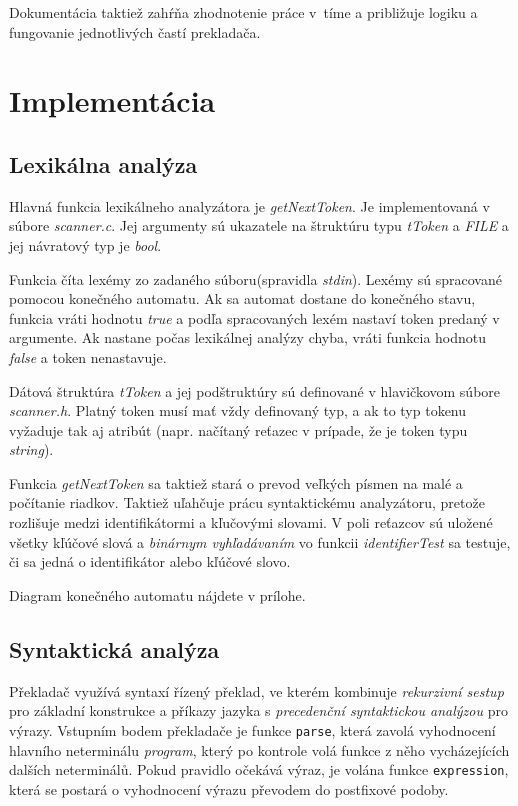 \documentclass{article}
\begin{document}
        Dokumentácia taktiež zahŕňa zhodnotenie práce v~tíme a približuje logiku a fungovanie
        jednotlivých častí prekladača. 
    
    \section{Implementácia}
    
        \subsection{Lexikálna analýza}
        Hlavná funkcia lexikálneho analyzátora je \emph{getNextToken}. Je implementovaná v súbore \emph{scanner.c}.
        Jej argumenty sú ukazatele na štruktúru typu \emph{tToken} a \emph{FILE} a jej návratový typ je \emph{bool}. 

        Funkcia číta lexémy zo zadaného súboru(spravidla \emph{stdin}). Lexémy sú spracované pomocou konečného automatu. 
        Ak sa automat dostane do konečného stavu, funkcia vráti hodnotu \emph{true} a podľa spracovaných lexém nastaví
        token predaný v argumente. Ak nastane počas lexikálnej analýzy chyba, vráti funkcia hodnotu \emph{false} a 
        token nenastavuje. 

        Dátová štruktúra \emph{tToken} a jej podštruktúry sú definované v hlavičkovom súbore \emph{scanner.h}. 
        Platný token musí mať vždy definovaný typ, a ak to typ tokenu vyžaduje tak aj atribút 
        (napr. načítaný reťazec v prípade, že je token typu \emph{string}). 

        Funkcia \emph{getNextToken} sa taktiež stará o prevod veľkých písmen na malé a počítanie riadkov.
        Taktiež uľahčuje prácu syntaktickému analyzátoru, pretože rozlišuje medzi identifikátormi a kľučovými slovami.
        V poli reťazcov sú uložené všetky kľúčové slová a \emph{binárnym vyhľadávaním} vo funkcii \emph{identifierTest} 
        sa testuje, či sa jedná o identifikátor alebo kľúčové slovo.

        Diagram konečného automatu nájdete v prílohe.

        \subsection{Syntaktická analýza}
            Překladač využívá syntaxí řízený překlad, ve kterém kombinuje \emph{rekurzivní sestup} pro základní konstrukce
            a příkazy jazyka s \emph{precedenční syntaktickou analýzou} pro výrazy.
            Vstupním bodem překladače je funkce \texttt{parse}, která zavolá vyhodnocení hlavního neterminálu \emph{program},
            který po kontrole volá funkce z něho vycházejících dalších neterminálů.
            Pokud pravidlo očekává výraz, je volána funkce \texttt{expression}, která se postará o vyhodnocení výrazu převodem
            do postfixové podoby.
            
\end{document}
